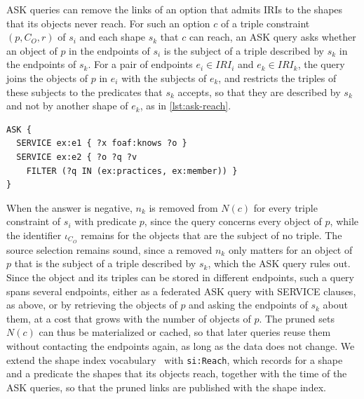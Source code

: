 ASK queries can remove the links of an option that admits \acp{IRI} to the shapes that its objects never reach.
For such an option $c$ of a triple constraint $(p, C_O, r)$ of $s_i$ and each shape $s_k$ that $c$ can reach, an ASK query asks whether an object of $p$ in the endpoints of $s_i$ is the subject of a triple described by $s_k$ in the endpoints of $s_k$.
For a pair of endpoints $e_i \in \mathit{IRI}_i$ and $e_k \in \mathit{IRI}_k$, the query joins the objects of $p$ in $e_i$ with the subjects of $e_k$,
and restricts the triples of these subjects to the predicates that $s_k$ accepts, so that they are described by $s_k$ and not by another shape of $e_k$, as in \cref{lst:ask-reach}.
\begin{lstlisting}[caption={ASK query checking whether the \texttt{foaf:knows} objects of the users of \cref{fig:running-example}, if constrained only to be \acp{IRI}, reach \texttt{ex:ClubShape}.
The users are stored in \texttt{ex:e1} and the clubs in \texttt{ex:e2}.
The filter lists \texttt{ex:practices} and \texttt{ex:member}, the predicates that \texttt{ex:ClubShape} accepts, which excludes the hobbies stored in the same endpoint.
A positive answer keeps the link from \texttt{ex:UserShape} to \texttt{ex:ClubShape}, and a negative answer removes it.},label={lst:ask-reach}]
ASK {
  SERVICE ex:e1 { ?x foaf:knows ?o }
  SERVICE ex:e2 { ?o ?q ?v
    FILTER (?q IN (ex:practices, ex:member)) }
}
\end{lstlisting}
When the answer is negative, $n_k$ is removed from $N(c)$ for every triple constraint of $s_i$ with predicate $p$, since the query concerns every object of $p$,
while the identifier $\iota_{C_O}$ remains for the objects that are the subject of no triple.
The source selection remains sound, since a removed $n_k$ only matters for an object of $p$ that is the subject of a triple described by $s_k$, which the ASK query rules out.
Since the object and its triples can be stored in different endpoints, such a query spans several endpoints,
either as a federated ASK query with SERVICE clauses, as above, or by retrieving the objects of $p$ and asking the endpoints of $s_k$ about them,
at a cost that grows with the number of objects of $p$.
The pruned sets $N(c)$ can thus be materialized or cached, so that later queries reuse them without contacting the endpoints again, as long as the data does not change.
We extend the shape index vocabulary~\cite{tam2025} with \texttt{si:Reach}, which records for a shape and a predicate the shapes that its objects reach, together with the time of the ASK queries, so that the pruned links are published with the shape index.

